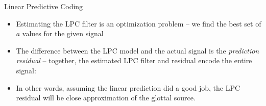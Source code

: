 \documentclass{beamer}
\begin{document}
\begin{frame}
Linear Predictive Coding
\begin{itemize}
\item{Estimating the LPC filter is an optimization problem -- we find the best set of $a$ values for the given signal}
\item{The difference between the LPC model and the actual signal is the \textit{prediction residual} -- together, the estimated LPC filter and residual encode the entire signal:}
\end{itemize}
\begin{itemize}
\item{In other words, assuming the linear prediction did a good job, the LPC residual will be close approximation of the glottal source.}
\end{itemize}
\end{frame}
\end{document}
